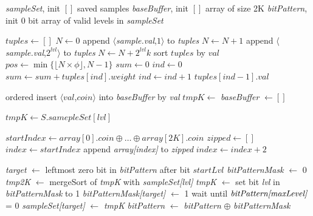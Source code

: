 \begin{algorithm}[htb]
\small
\begin{algorithmic}[1]

	\Vars
	\State \emph{sampleSet}, init $[ ]$ \Comment saved samples
	\State \emph{baseBuffer}, init $[ ]$ \Comment array of size 2K
	\State \emph{bitPattern}, init 0 \Comment bit array of valid levels in \emph{sampleSet}
	\EndFor

	\Statex
	\State $tuples \leftarrow [ ]$
	\State $N \leftarrow 0$
		\State append $\langle$\emph{sample.val},\emph{$1$}$\rangle$ to \emph{tuples}
		\State $N \leftarrow N + 1$
	\EndFor
			\State append $\langle$\emph{sample.val},\emph{$2^{lvl}$}$\rangle$ to \emph{tuples}
		\EndFor
		\State $N \leftarrow N + 2^{lvl}k$
	\EndFor
	\State sort $tuples$ by $val$
	\State $pos \leftarrow \min {\{\lfloor N \times \phi \rfloor, N-1\}}$
	\State $sum \leftarrow 0$
	\State $ind \leftarrow 0$
		\State $sum \leftarrow sum + tuples[ind].weight$
		\State $ind \leftarrow ind + 1$
	\EndWhile
	\State \Return $tuples[ind-1].val$ 
	\EndProcedure

	\Statex
	\State ordered insert $\langle val$,$coin \rangle$ into \emph{baseBuffer} by \emph{val}
		\State $tmpK \leftarrow$ 
		\State {}
		\State \emph{baseBuffer} $\leftarrow [ ]$ 
	\EndIf
	\EndProcedure

	\Statex
		\State $tmpK \leftarrow S.samepleSet[lvl]$
	\EndFor
	\EndProcedure

	\Statex
		\State $startIndex \leftarrow array[0].coin \oplus \dots \oplus array[2K].coin$
		\State $zipped \leftarrow [ ]$
		\State $index \leftarrow startIndex$
			\State append \emph{array[index]} to \emph{zipped}
			\State $index \leftarrow index + 2$
		\EndWhile
		\State {}
	\EndProcedure

	\Statex
		\State \emph{target} $\leftarrow$ leftmost zero bit in \emph{bitPattern} after bit $startLvl$
		\State \emph{bitPatternMask} $\leftarrow$ 0
				\State \emph{tmp2K} $\leftarrow$ mergeSort of \emph{tmpK} with \emph{sampleSet[lvl]}
				\State \emph{tmpK} $\leftarrow$ 
				\State set bit \emph{lvl} in \emph{bitPatternMask} to 1
		\EndFor
		\State \emph{bitPatternMask[target]} $\leftarrow$ 1
			\State wait until $\emph{bitPattern[maxLevel]}$ = 0
		\EndIf
		\State \emph{sampleSet[target]} $\leftarrow$ \emph{tmpK}
		 \emph{bitPattern} $\leftarrow$ \emph{bitPattern} $\oplus$ \emph{bitPatternMask}
	\EndProcedure


\end{algorithmic}
\end{algorithm}
